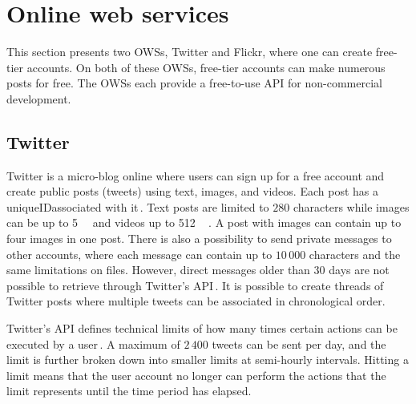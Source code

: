 \section{Online web services}
\label{sec:ows}
This section presents two \gls{OWS}s, Twitter and Flickr, where one can create \mbox{free-tier} accounts. On both of these \gls{OWS}s, \mbox{free-tier} accounts can make numerous posts for free. The \gls{OWS}s each provide a \mbox{free-to-use} \gls{API} for \mbox{non-commercial} development. 

\subsection{Twitter}
\label{subsec:ows_twitter}
Twitter is a \mbox{micro-blog} online where users can sign up for a free account and create public posts (tweets) using text, images, and videos. Each post has a uniqueIDassociated with it\,\cite{twitterTwitterIDs}. Text posts are limited to $280$ characters while images can be up to \SI{5}{\mega\byte} and videos up to \SI{512}{\mega\byte}\,\cite{MediaBestPractices}. A post with images can contain up to four images in one post. There is also a possibility to send private messages to other accounts, where each message can contain up to $10\,000$ characters and the same limitations on files. However, direct messages older than $30$ days are not possible to retrieve through Twitter's \gls{API}\,\cite{RetrievingOlder302018}. It is possible to create threads of Twitter posts where multiple tweets can be associated in chronological order.

Twitter's \gls{API} defines technical limits of how many times certain actions can be executed by a user\,\cite{UnderstandingTwitterLimits}. A maximum of $2\,400$ tweets can be sent per day, and the limit is further broken down into smaller limits at \mbox{semi-hourly} intervals. Hitting a limit means that the user account no longer can perform the actions that the limit represents until the time period has elapsed.

